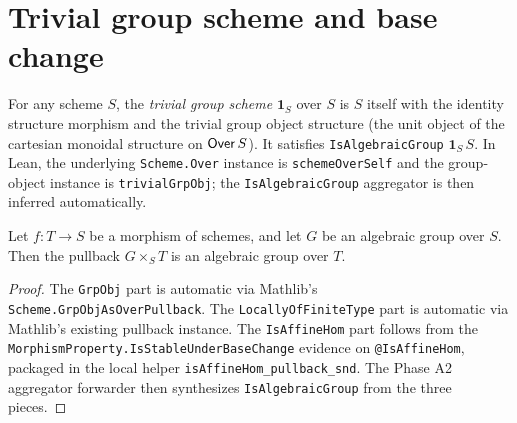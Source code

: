 \section{Trivial group scheme and base change}

\begin{definition}\label{def:trivial-group}
\leanok
{}
For any scheme $S$, the \emph{trivial group scheme} $\mathbf{1}_S$ over $S$
is $S$ itself with the identity structure morphism and the trivial group
object structure (the unit object of the cartesian monoidal structure on
$\mathsf{Over}\,S$). It satisfies \texttt{IsAlgebraicGroup} $\mathbf{1}_S\,S$.
In Lean, the underlying \texttt{Scheme.Over} instance is
\texttt{schemeOverSelf} and the group-object instance is
\texttt{trivialGrpObj}; the \texttt{IsAlgebraicGroup} aggregator is then
inferred automatically.
\end{definition}

\begin{lemma}
  \label{lem:base-change-algebraic}
\leanok
{}
Let $f : T \to S$ be a morphism of schemes, and let $G$ be an algebraic group
over $S$. Then the pullback $G \times_S T$ is an algebraic group over $T$.
\end{lemma}
\begin{proof}
\leanok
The \texttt{GrpObj} part is automatic via Mathlib's
\texttt{Scheme.GrpObjAsOverPullback}. The \texttt{LocallyOfFiniteType}
part is automatic via Mathlib's existing pullback instance. The
\texttt{IsAffineHom} part follows from the
\texttt{MorphismProperty.IsStableUnderBaseChange} evidence on
\texttt{@IsAffineHom}, packaged in the local helper
\texttt{isAffineHom\_pullback\_snd}. The Phase A2 aggregator forwarder
then synthesizes \texttt{IsAlgebraicGroup} from the three pieces.
\end{proof}

